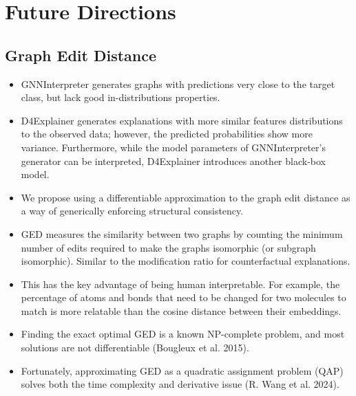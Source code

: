 \documentclass[
  11pt,
  letterpaper,
]{article}
\begin{document}
\hypertarget{future-directions}{%
\section{Future Directions}\label{future-directions}}

\hypertarget{graph-edit-distance}{%
\subsection{Graph Edit Distance}\label{graph-edit-distance}}

\begin{itemize}
\item
  GNNInterpreter generates graphs with predictions very close to the
  target class, but lack good in-distributions properties.
\item
  D4Explainer generates explanations with more similar features
  distributions to the observed data; however, the predicted
  probabilities show more variance. Furthermore, while the model
  parameters of GNNInterpreter's generator can be interpreted,
  D4Explainer introduces another black-box model.
\item
  We propose using a differentiable approximation to the graph edit
  distance as a way of generically enforcing structural consistency.
\item
  GED measures the similarity between two graphs by counting the minimum
  number of edits required to make the graphs isomorphic (or subgraph
  isomorphic). Similar to the modification ratio for counterfactual
  explanations.
\item
  This has the key advantage of being human interpretable. For example,
  the percentage of atoms and bonds that need to be changed for two
  molecules to match is more relatable than the cosine distance between
  their embeddings.
\item
  Finding the exact optimal GED is a known NP-complete problem, and most
  solutions are not differentiable (Bougleux et al. 2015).
\item
  Fortunately, approximating GED as a quadratic assignment problem (QAP)
  solves both the time complexity and derivative issue (R. Wang et al.
  2024).
\end{itemize}
\end{document}
